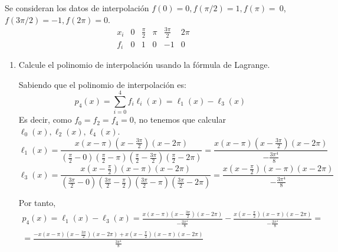 \begin{ejercicio}
    Se consideran los datos de interpolación $f(0) = 0, f(\pi/2) = 1, f(\pi) =~0$, $f(3\pi/2) = -1, f(2\pi) = 0$.
    \begin{equation*}
        \begin{array}{c|ccccc}
            x_i & 0 & \frac{\pi}{2} & \pi & \frac{3\pi}{2} & 2\pi \\ \hline
            f_i & 0 & 1 & 0 & -1 & 0
        \end{array}
    \end{equation*}
    \begin{enumerate}
        \item Calcule el polinomio de interpolación usando la fórmula de Lagrange.

        Sabiendo que el polinomio de interpolación es:
        \begin{equation*}
            p_4(x) = \sum_{i=0}^4 f_i\ell_i(x) = \ell_1(x) - \ell_3(x)
        \end{equation*}
        Es decir, como $f_0=f_2=f_4 = 0$, no tenemos que calcular $\ell_0(x), \ell_2(x), \ell_4(x)$.
        \begin{equation*}
            \ell_1(x) = \frac{x(x-\pi)(x-\frac{3\pi}{2}) (x-2\pi)}{\left(\frac{\pi}{2}-0\right)\left(\frac{\pi}{2}-\pi\right)\left(\frac{\pi}{2}-\frac{3\pi}{2}\right)\left(\frac{\pi}{2}-2\pi\right)}
            = \frac{x(x-\pi)(x-\frac{3\pi}{2}) (x-2\pi)}{-\frac{3\pi^4}{8}}
        \end{equation*}
        \begin{equation*}
            \ell_3(x) = \frac{x(x-\frac{\pi}{2})(x-\pi) (x-2\pi)}{\left(\frac{3\pi}{2}-0\right)\left(\frac{3\pi}{2}-\frac{\pi}{2}\right)\left(\frac{3\pi}{2}-\pi\right)\left(\frac{3\pi}{2}-2\pi\right)}
            =\frac{x(x-\frac{\pi}{2})(x-\pi) (x-2\pi)}{-\frac{3\pi^4}{8}}
        \end{equation*}

        Por tanto,
        \begin{multline*}
            p_4(x) = \ell_1(x) - \ell_3(x) 
            = \frac{x(x-\pi)(x-\frac{3\pi}{2}) (x-2\pi)}{-\frac{3\pi^4}{8}} - \frac{x(x-\frac{\pi}{2})(x-\pi) (x-2\pi)}{-\frac{3\pi^4}{8}}
            =\\=
            \frac{-x(x-\pi)(x-\frac{3\pi}{2}) (x-2\pi)+x(x-\frac{\pi}{2})(x-\pi) (x-2\pi)}{\frac{3\pi^4}{8}}
        \end{multline*}
        

\end{enumerate}
\end{ejercicio}

